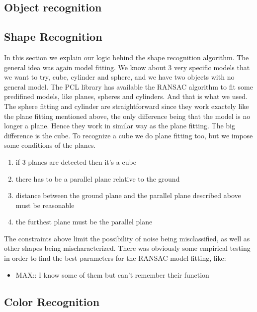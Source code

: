 \subsection{Object recognition} 
 
\subsection{Shape Recognition}

In this section we explain our logic behind the shape recognition algorithm.
The general idea was again model fitting.
We know about 3 very specific models that we want to try, cube, cylinder and sphere, and we have two objects with no general model.
The PCL library has available the RANSAC algorithm to fit some predifined models, like planes, spheres and cylinders. 
And that is what we used. 
The sphere fitting and cylinder are straightforward since they work exactely like the plane fitting mentioned above, the only difference being that the model is no longer a plane.
Hence they work in similar way as the plane fitting.
The big difference is the cube.
To recognize a cube we do plane fitting too, but we impose some conditions of the planes.

\begin{enumerate}
\item if 3 planes are detected then it's a cube
\item there has to be a parallel plane relative to the ground
\item distance between the ground plane and the parallel plane described above must be reasonable
\item the furthest plane must be the parallel plane
\end{enumerate}

The constraints above limit the possibility of noise being misclassified, as well as other shapes being mischaracterized.
There was obviously some empirical testing in order to find the best parameters for the RANSAC model fitting, like: 

\begin{itemize}
\item MAX:: I know some of them but can't remember their function
\end{itemize}


\subsection{Color Recognition}

